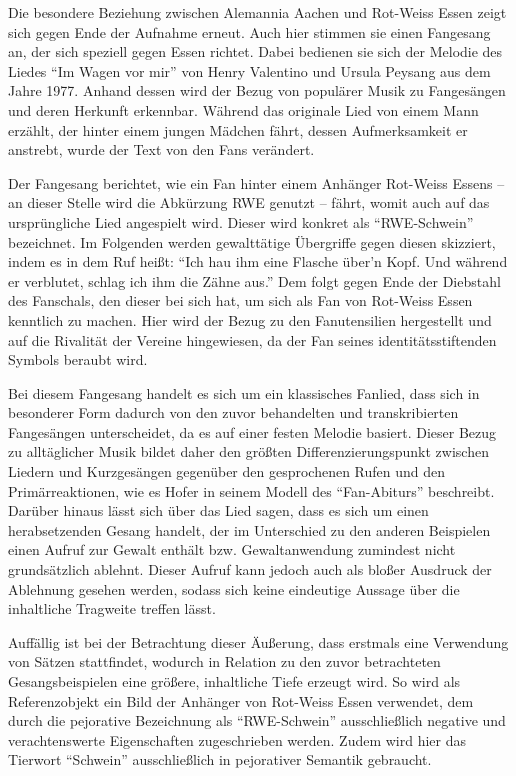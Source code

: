 Die besondere Beziehung zwischen Alemannia Aachen und Rot-Weiss Essen zeigt sich gegen Ende der Aufnahme erneut.
Auch hier stimmen sie einen Fangesang an, der sich speziell gegen Essen richtet.
Dabei bedienen sie sich der Melodie des Liedes "`Im Wagen vor mir"' von Henry Valentino und Ursula Peysang aus dem Jahre 1977.
Anhand dessen wird der Bezug von populärer Musik zu Fangesängen und deren Herkunft erkennbar.
Während das originale Lied von einem Mann erzählt, der hinter einem jungen Mädchen fährt, dessen Aufmerksamkeit er anstrebt, wurde der Text von den Fans verändert.

Der Fangesang berichtet, wie ein Fan hinter einem Anhänger Rot-Weiss Essens – an dieser Stelle wird die Abkürzung RWE genutzt – fährt, womit auch auf das ursprüngliche Lied angespielt wird.
Dieser wird konkret als "`RWE-Schwein"' bezeichnet.
Im Folgenden werden gewalttätige Übergriffe gegen diesen skizziert, indem es in dem Ruf heißt:
"`Ich hau ihm eine Flasche über'n Kopf.
Und während er verblutet, schlag ich ihm die Zähne aus."'
Dem folgt gegen Ende der Diebstahl des Fanschals, den dieser bei sich hat, um sich als Fan von Rot-Weiss Essen kenntlich zu machen.
Hier wird der Bezug zu den Fanutensilien hergestellt und auf die Rivalität der Vereine hingewiesen, da der Fan seines identitätsstiftenden Symbols beraubt wird.

Bei diesem Fangesang handelt es sich um ein klassisches Fanlied, dass sich in besonderer Form dadurch von den zuvor behandelten und transkribierten Fangesängen unterscheidet, da es auf einer festen Melodie basiert.
Dieser Bezug zu alltäglicher Musik bildet daher den größten Differenzierungspunkt zwischen Liedern und Kurzgesängen gegenüber den gesprochenen Rufen und den Primärreaktionen, wie es Hofer in seinem Modell des "`Fan-Abiturs"' beschreibt.
Darüber hinaus lässt sich über das Lied sagen, dass es sich um einen herabsetzenden Gesang handelt, der im Unterschied zu den anderen Beispielen einen Aufruf zur Gewalt enthält bzw. Gewaltanwendung zumindest nicht grundsätzlich ablehnt.
Dieser Aufruf kann jedoch auch als bloßer Ausdruck der Ablehnung gesehen werden, sodass sich keine eindeutige Aussage über die inhaltliche Tragweite treffen lässt.

Auffällig ist bei der Betrachtung dieser Äußerung, dass erstmals eine Verwendung von Sätzen stattfindet, wodurch in Relation zu den zuvor betrachteten Gesangsbeispielen eine größere, inhaltliche Tiefe erzeugt wird.
So wird als Referenzobjekt ein Bild der Anhänger von Rot-Weiss Essen verwendet, dem durch die pejorative Bezeichnung als "`RWE-Schwein"' ausschließlich negative und verachtenswerte Eigenschaften zugeschrieben werden.
Zudem wird hier das Tierwort "`Schwein"' ausschließlich in pejorativer Semantik gebraucht.


